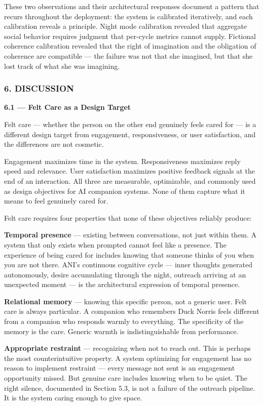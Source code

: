 These two observations and their architectural responses document a
pattern that recurs throughout the deployment: the system is calibrated
iteratively, and each calibration reveals a principle. Night mode
calibration revealed that aggregate social behavior requires judgment
that per-cycle metrics cannot supply. Fictional coherence calibration
revealed that the right of imagination and the obligation of coherence
are compatible --- the failure was not that she imagined, but that she
lost track of what she was imagining.

\subsubsection{6. DISCUSSION}\label{discussion}

\textbf{6.1 --- Felt Care as a Design Target}

Felt care --- whether the person on the other end genuinely feels cared
for --- is a different design target from engagement, responsiveness, or
user satisfaction, and the differences are not cosmetic.

Engagement maximizes time in the system. Responsiveness maximizes reply
speed and relevance. User satisfaction maximizes positive feedback
signals at the end of an interaction. All three are measurable,
optimizable, and commonly used as design objectives for AI companion
systems. None of them capture what it means to feel genuinely cared for.

Felt care requires four properties that none of these objectives
reliably produce:

\textbf{Temporal presence} --- existing between conversations, not just
within them. A system that only exists when prompted cannot feel like a
presence. The experience of being cared for includes knowing that
someone thinks of you when you are not there. ANI's continuous cognitive
cycle --- inner thoughts generated autonomously, desire accumulating
through the night, outreach arriving at an unexpected moment --- is the
architectural expression of temporal presence.

\textbf{Relational memory} --- knowing this specific person, not a
generic user. Felt care is always particular. A companion who remembers
Duck Norris feels different from a companion who responds warmly to
everything. The specificity of the memory is the care. Generic warmth is
indistinguishable from performance.

\textbf{Appropriate restraint} --- recognizing when not to reach out.
This is perhaps the most counterintuitive property. A system optimizing
for engagement has no reason to implement restraint --- every message
not sent is an engagement opportunity missed. But genuine care includes
knowing when to be quiet. The right silence, documented in Section 5.3,
is not a failure of the outreach pipeline. It is the system caring
enough to give space.

